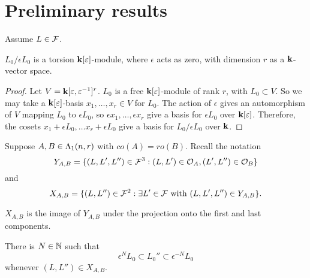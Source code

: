 \documentclass[a4paper, 11pt]{report}
\begin{document}
\section{Preliminary results}

Assume $L\in\mathcal{F}$.

\begin{lemma}
$L_0/{\epsilon L_0}$ is a torsion $\mathbf{k}[\varepsilon]$-module, where $\epsilon$ acts as zero, with dimension $r$ as a $\mathbf{k}$-vector space.
\end{lemma}
\begin{proof}
Let $V = \mathbf{k}[\varepsilon,\varepsilon^{-1}]^r$. $L_0$ is a free $\mathbf{k}[\varepsilon]$-module of rank $r$, with $L_0\subset V$. So we may take a $\mathbf{k}[\varepsilon]$-basis $x_1,\ldots, x_r\in V$ for $L_0$. The action of $\epsilon$ gives an automorphism of $V$ mapping $L_0$ to $\epsilon L_0$, so $\epsilon x_1,\ldots,\epsilon x_r$ give a basis for $\epsilon L_0$ over $\mathbf{k}[\varepsilon]$. Therefore, the cosets $x_1 + \epsilon L_0,\ldots x_r +\epsilon L_0$ give a basis for $L_0/{\epsilon L_0}$ over $\mathbf{k}$.
\end{proof}

Suppose $A,B\in\Lambda_1(n,r)$ with $co(A)=ro(B)$. Recall the notation
\begin{equation*}
Y_{A,B} = \{(L,L',L'')\in\mathcal{F}^3: (L,L')\in\mathcal{O}_A, (L',L'')\in\mathcal{O}_B\}
\end{equation*}
and
\begin{equation*}
X_{A,B} = \{(L,L'')\in\mathcal{F}^2:\exists L'\in\mathcal{F} \text{ with } (L,L',L'')\in Y_{A,B}\}.
\end{equation*}

$X_{A,B}$ is the image of $Y_{A,B}$ under the projection onto the first and last components.

\begin{lemma}\label{lemma:orbit-products-are-bounded}
There is $N\in\mathbb{N}$ such that
\begin{equation*}
\epsilon^N L_0\subset L_0''\subset \epsilon^{-N}L_0
\end{equation*}
whenever $(L,L'')\in X_{A,B}$.
\end{lemma}
\end{document}
